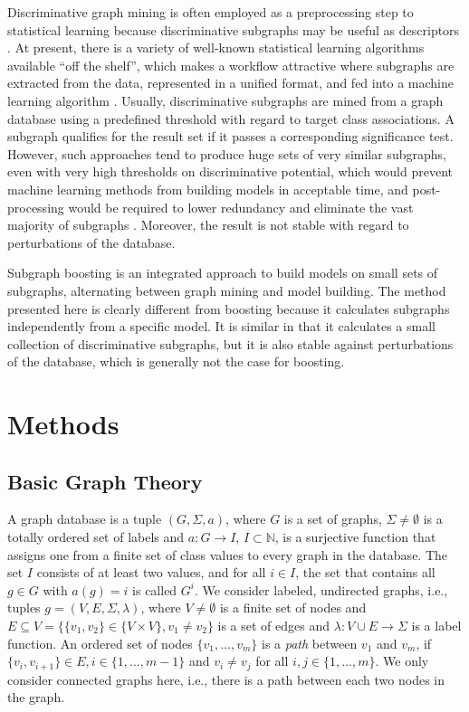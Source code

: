 \documentclass{sig-alternate}
\begin{document}
Discriminative graph mining is often employed as a preprocessing step to
statistical learning because discriminative subgraphs may be useful as descriptors
\cite{bringmann10lego}. At present, there is a variety of well-known statistical
learning algorithms available ``off the shelf'', which makes a workflow
attractive where subgraphs are extracted from the data, represented in a
unified format, and fed into a machine learning algorithm \cite{KRH01}.
Usually, discriminative subgraphs are mined from a graph database using a
predefined threshold with regard to target class associations. A subgraph
qualifies for the result set if it passes a corresponding significance test.
However, such approaches tend to produce huge sets of very similar subgraphs,
even with very high thresholds on discriminative potential, which would prevent
machine learning methods from building models in acceptable time, and post-processing 
would be required to lower redundancy and eliminate the vast
majority of subgraphs \cite{Jun04Spin}. Moreover, the
result is not stable with regard to perturbations of the database.

Subgraph boosting \cite{saigo09gboost} is an integrated approach to build models on
small sets of subgraphs, alternating between graph mining and model building. The method presented here is clearly
different from boosting because it calculates subgraphs independently from a specific model. It is similar in that it calculates a small
collection of discriminative subgraphs, but it is also stable against
perturbations of the database, which is generally not the case for boosting.


\section{Methods}
\label{s:Methods}

\subsection{Basic Graph Theory}
\label{ss:BasicGraphTheory}
A graph database is a tuple $(G, \Sigma, a)$, where $G$ is a set of graphs,
$\Sigma \ne \emptyset$  is a totally ordered set of labels and $a: G
\rightarrow I$, $I \subset \mathbb{N}$, is a surjective function that assigns one from a
finite set of class values to every graph in the database. The set 
$I$ consists of at least two values, and for all $i \in I$, the set that contains all $g \in G$
with $a(g)=i$ is called $G^i$. We consider labeled, undirected
graphs, i.e., tuples $g=(V,E,\Sigma,\lambda)$, where $V\ne \emptyset$ is a
finite set of nodes and $E \subseteq V = \{\{v_1, v_2\} \in \{V \times V\}, v_1
\ne v_2\}$ is a set of edges and $\lambda: V\cup E \rightarrow \Sigma$ is a
label function. 
An ordered set of nodes $\{ v_1, \ldots, v_m\}$ is a \emph{path} between $v_1$ and $v_m$, if $\{v_i, v_{i+1}\} \in E, i \in \{1,\ldots,m-1\}$ and $v_i \neq v_j$ for all $i,j\in \{1,\ldots,m\}$.
We only consider connected graphs here, i.e., there is a path
between each two nodes in the graph.
\end{document}
